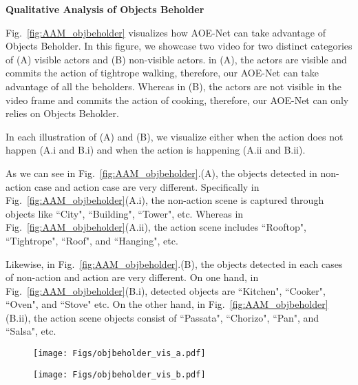 \documentclass[sn-mathphys]{sn-jnl}
\theoremstyle{thmstyleone}\newtheorem{theorem}{Theorem}\newtheorem{proposition}[theorem]{Proposition}
\theoremstyle{thmstyletwo}\newtheorem{example}{Example}\newtheorem{remark}{Remark}
\theoremstyle{thmstylethree}\newtheorem{definition}{Definition}
\begin{document}
\noindent\textbf{Qualitative Analysis of Objects Beholder}

Fig.~\ref{fig:AAM_objbeholder} visualizes how AOE-Net can take advantage of Objects Beholder.
In this figure, we showcase two video for two distinct categories of (A) visible actors and (B) non-visible actors. in (A), the actors are visible and commits the action of tightrope walking, therefore, our AOE-Net can take advantage of all the beholders. Whereas in (B), the actors are not visible in the video frame and commits the action of cooking, therefore, our AOE-Net can only relies on Objects Beholder.

\noindent In each illustration of (A) and (B), we visualize either when the action does not happen (A.i and B.i) and when the action is happening (A.ii and B.ii).

\noindent As we can see in Fig.~\ref{fig:AAM_objbeholder}.(A), the objects detected in non-action case and action case are very different. Specifically in Fig.~\ref{fig:AAM_objbeholder}(A.i), the non-action scene is captured through objects like ``City", ``Building", ``Tower", etc. Whereas in Fig.~\ref{fig:AAM_objbeholder}(A.ii), the action scene includes ``Rooftop", ``Tightrope", ``Roof", and ``Hanging", etc.

\noindent Likewise, in Fig.~\ref{fig:AAM_objbeholder}.(B), the objects detected in each cases of non-action and action are very different. On one hand, in Fig.~\ref{fig:AAM_objbeholder}(B.i), detected objects are ``Kitchen", ``Cooker", ``Oven", and ``Stove" etc. On the other hand, in Fig.~\ref{fig:AAM_objbeholder}(B.ii), the action scene objects consist of ``Passata", ``Chorizo", ``Pan", and ``Salsa", etc.

\begin{figure*}[!ht]
     \centering
     \begin{subfigure}[b]{0.8\textwidth}
         \centering
         \texttt{[image: Figs/objbeholder\_vis\_a.pdf]}
         \label{fig:objbeh_1}
     \vspace{-3mm}
     \end{subfigure}
     \begin{subfigure}[b]{0.8\textwidth}
         \centering
         \texttt{[image: Figs/objbeholder\_vis\_b.pdf]}
         \label{fig:objbeh_2}
     \vspace{-3mm}
     \end{subfigure}
\caption{Qualitative results to illustrate the effectiveness of Objects Beholder with AAM in (A) videos with visible actors and (B) videos with non-visible actor. In each case, we illustrate two instances of having action and without action. The input frames are shown on the left, its objects detected by CLIP are shown in the middle, and the most relevant objects selected by AAM are shown in the right.}
\label{fig:AAM_objbeholder}
\end{figure*}
\end{document}
